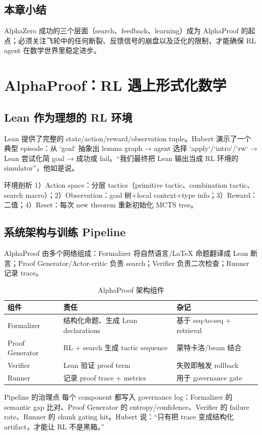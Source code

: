 \documentclass[a4paper]{article}
\begin{document}
\subsection{本章小结}
AlphaZero 成功的三个层面（search、feedback、learning）成为 AlphaProof 的起点；必须关注飞轮中的任何断裂、反馈信号的崩盘以及泛化的限制，才能确保 RL agent 在数学世界里稳定进步。
\newpage

\section{AlphaProof：RL 遇上形式化数学}

\subsection{Lean 作为理想的 RL 环境}
Lean 提供了完整的 state/action/reward/observation tuple。Hubert 演示了一个典型 episode：从 `goal` 抽象出 lemma graph → agent 选择 `apply`/`intro`/`rw` → Lean 尝试化简 goal → 成功或 fail。“我们最终把 Lean 输出当成 RL 环境的 simulator”，他如是说。
\begin{importantbox}{环境剖析}
1）Action space：分层 tactics（primitive tactic、combination tactic、search macro）；2）Observation：goal 树+local context+type info；3）Reward：二值；4）Reset：每次 new theorem 重新初始化 MCTS tree。
\end{importantbox}

\subsection{系统架构与训练 Pipeline}
AlphaProof 由多个网络组成：Formalizer 将自然语言/LaTeX 命题翻译成 Lean 断言；Proof Generator/Actor-critic 负责 search；Verifier 负责二次检查；Runner 记录 trace。
\begin{table}[H]
\centering
\begin{tabular}{p{4.5cm}p{4.5cm}p{4cm}}
\toprule
组件 & 责任 & 杂记 \\
\midrule
Formalizer & 结构化命题、生成 Lean declarations & 基于 seq-to-seq + retrieval \\
Proof Generator & RL + search 生成 tactic sequence & 蒙特卡洛/beam 结合 \\
Verifier & Lean 验证 proof term & 失败即触发 rollback \\
Runner & 记录 proof trace + metrics & 用于 governance gate \\
\bottomrule
\end{tabular}
\caption{AlphaProof 架构组件}
\end{table}
\begin{knowledgebox}{Pipeline 的治理点}
每个 component 都写入 governance log：Formalizer 的 semantic gap 比对、Proof Generator 的 entropy/confidence、Verifier 的 failure rate、Runner 的 chunk gating hit。Hubert 说：“只有把 trace 变成结构化 artifact，才能让 RL 不是黑箱。”
\end{knowledgebox}
\end{document}
